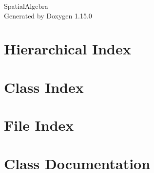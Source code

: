 \documentclass[twoside]{book}
\newcommand{\+}{\discretionary{\mbox{\scriptsize$\hookleftarrow$}}{}{}}
\newcommand{\clearemptydoublepage}{%
    \newpage{\pagestyle{empty}\cleardoublepage}%
  }
\begin{document}
  \raggedbottom
    \hypersetup{pageanchor=false,
                bookmarksnumbered=true,
                pdfencoding=unicode
               }
  \begin{titlepage}
  \vspace*{7cm}
  \begin{center}%
  {\Large Spatial\+Algebra}\\
  \vspace*{1cm}
  {\large Generated by Doxygen 1.15.0}\\
  \end{center}
  \end{titlepage}
  \clearemptydoublepage
  \tableofcontents
  \clearemptydoublepage
  \hypersetup{pageanchor=true}
\chapter{Hierarchical Index}

\chapter{Class Index}

\chapter{File Index}

\chapter{Class Documentation}













\end{document}
